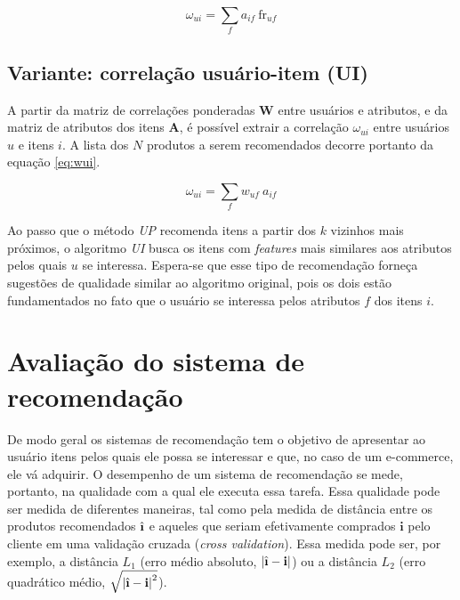 \begin{equation}
\label{eq:wi} 
    \omega_{ui} = \sum_{f}{a_{if}~\mathrm{fr}_{uf}}
\end{equation} 

\subsection{Variante: correlação usuário-item (UI)} %
\label{sub:variante_correla_o_usu_rio_item_}

A partir da matriz de correlações ponderadas $\mathbf{W}$ entre usuários e atributos, e da matriz de atributos dos itens $\mathbf{A}$, é possível extrair a correlação $\omega_{ui}$ entre usuários $u$ e itens $i$. A lista dos $N$ produtos a serem recomendados decorre portanto da equação \ref{eq:wui}.

\begin{equation}
\label{eq:wui} 
    \omega_{ui} = \sum_{f}{w_{uf}~a_{if}}
\end{equation} 

Ao passo que o método \textit{UP} recomenda itens a partir dos $k$ vizinhos mais próximos, o algoritmo \textit{UI} busca os itens com \textit{features} mais similares aos atributos pelos quais $u$ se interessa. Espera-se que esse tipo de recomendação forneça sugestões de qualidade similar ao algoritmo original, pois os dois estão fundamentados no fato que o usuário se interessa pelos atributos $f$ dos itens $i$. 



\section{Avaliação do sistema de recomendação} %
\label{sec:avalia_o_do_sistema_de_recomenda_o}


De modo geral os sistemas de recomendação tem o objetivo de apresentar ao usuário itens pelos quais ele possa se interessar e que, no caso de um e-commerce,  ele vá adquirir. O desempenho de um sistema de recomendação se mede, portanto, na qualidade com a qual ele executa essa tarefa. Essa qualidade pode ser medida de diferentes maneiras, tal como pela medida de distância entre os produtos recomendados $\hat{\textbf{\i}}$ e aqueles que seriam efetivamente comprados $\textbf{i}$ pelo cliente em uma validação cruzada (\textit{cross validation}). Essa medida pode ser, por exemplo, a distância $L_1$ (erro médio absoluto, $\left|\hat{\textbf{\i}} - \textbf{i}\right|$) ou a distância $L_2$ (erro quadrático médio,  $\sqrt{\left|\hat{\textbf{\i}} - \textbf{i}\right|^2}$).

